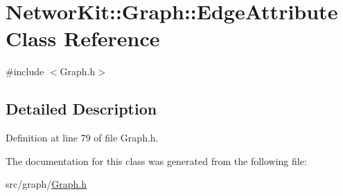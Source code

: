 \hypertarget{class_networ_kit_1_1_graph_1_1_edge_attribute}{\section{Networ\-Kit\-:\-:Graph\-:\-:Edge\-Attribute Class Reference}
\label{class_networ_kit_1_1_graph_1_1_edge_attribute}
}


{\ttfamily \#include $<$Graph.\-h$>$}



\subsection{Detailed Description}


Definition at line 79 of file Graph.\-h.



The documentation for this class was generated from the following file\-:\begin{DoxyCompactItemize}
\item 
src/graph/\hyperlink{_graph_8h}{Graph.\-h}\end{DoxyCompactItemize}
